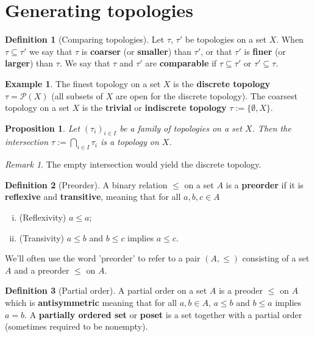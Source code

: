 \documentclass[a4paper,12pt,parskip=half*,chapterprefix=true,numbers=noendperiod]{scrreprt}
\newtheorem{proposition}{Proposition}[section]
\theoremstyle{definition}
\newtheorem{definition}{Definition}[section]
\newtheorem{example}{Example}[section]
\theoremstyle{remark}
\newtheorem*{remark}{Remark}
\begin{document}
\section{Generating topologies}


\begin{definition}[Comparing topologies]
	Let $\tau$, $\tau'$ be topologies on a set $X$. When $\tau\subseteq \tau'$ we say that $\tau$ is \textbf{coarser} (or \textbf{smaller}) than $\tau'$, or that $\tau'$ is \textbf{finer} (or \textbf{larger}) than $\tau$. We say that $\tau$ and $\tau'$ are \textbf{comparable} if $\tau\subseteq\tau'$ or $\tau'\subseteq\tau$.
\end{definition}
\begin{example}
	The finest topology on a set $X$ is the \textbf{discrete topology} $\tau=\mathcal{P}(X)$ (all subsets of $X$ are open for the discrete topology). The coarsest topology on a set $X$ is the \textbf{trivial} or \textbf{indiscrete topology} $\tau:=\{\emptyset,X\}$.
\end{example}

\begin{proposition}\label{prop:TopStableInt}
	Let $(\tau_i)_{i\in I}$ be a family of topologies on a set $X$. Then the intersection $\tau:=\bigcap_{i\in I}\tau_i$ is a topology on $X$.
\end{proposition}
\begin{remark}
	The empty intersection would yield the discrete topology.
\end{remark}

\begin{definition}[Preorder]
	A binary relation $\leq$ on a set $A$ is a \textbf{preorder} if it is \textbf{reflexive} and \textbf{transitive}, meaning that for all $a,b,c\in A$
	\begin{enumerate}[(i)]
		\item (Reflexivity) $a\leq a$;
		\item (Transivity) $a\leq b$ and $b\leq c$ implies $a\leq c$.
	\end{enumerate}
	We'll often use the word 'preorder' to refer to a pair $(A,\leq)$ consisting of a set $A$ and a preorder $\leq$ on $A$.
\end{definition}

\begin{definition}[Partial order]
	A partial order on a set $A$ is a preoder $\leq$ on $A$ which is \textbf{antisymmetric} meaning that for all $a,b\in A$, $a\leq b$ and $b\leq a$ implies $a=b$. A \textbf{partially ordered set} or \textbf{poset} is a set together with a partial order (sometimes required to be nonempty).
\end{definition}
\end{document}
